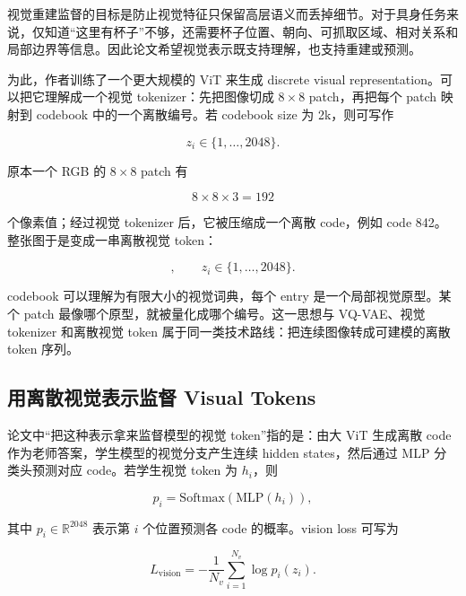 视觉重建监督的目标是防止视觉特征只保留高层语义而丢掉细节。对于具身任务来说，仅知道“这里有杯子”不够，还需要杯子位置、朝向、可抓取区域、相对关系和局部边界等信息。因此论文希望视觉表示既支持理解，也支持重建或预测。

为此，作者训练了一个更大规模的 ViT 来生成 discrete visual representation。可以把它理解成一个视觉 tokenizer：先把图像切成 $8\times8$ patch，再把每个 patch 映射到 codebook 中的一个离散编号。若 codebook size 为 2k，则可写作

\begin{equation}
    z_i \in \{1,\dots,2048\}.
\end{equation}

原本一个 RGB 的 $8\times8$ patch 有

\begin{equation}
    8 \times 8 \times 3 = 192
\end{equation}

个像素值；经过视觉 tokenizer 后，它被压缩成一个离散 code，例如 code 842。整张图于是变成一串离散视觉 token：

\begin{equation}
    [z_1,z_2,\dots,z_N], \qquad z_i \in \{1,\dots,2048\}.
\end{equation}

codebook 可以理解为有限大小的视觉词典，每个 entry 是一个局部视觉原型。某个 patch 最像哪个原型，就被量化成哪个编号。这一思想与 VQ-VAE、视觉 tokenizer 和离散视觉 token 属于同一类技术路线：把连续图像转成可建模的离散 token 序列。

\subsection{用离散视觉表示监督 Visual Tokens}

论文中“把这种表示拿来监督模型的视觉 token”指的是：由大 ViT 生成离散 code 作为老师答案，学生模型的视觉分支产生连续 hidden states，然后通过 MLP 分类头预测对应 code。若学生视觉 token 为 $h_i$，则

\begin{equation}
    p_i = \mathrm{Softmax}(\mathrm{MLP}(h_i)),
\end{equation}

其中 $p_i \in \mathbb{R}^{2048}$ 表示第 $i$ 个位置预测各 code 的概率。vision loss 可写为

\begin{equation}
    L_{\text{vision}}
    = -\frac{1}{N_v}\sum_{i=1}^{N_v}\log p_i(z_i).
\end{equation}

